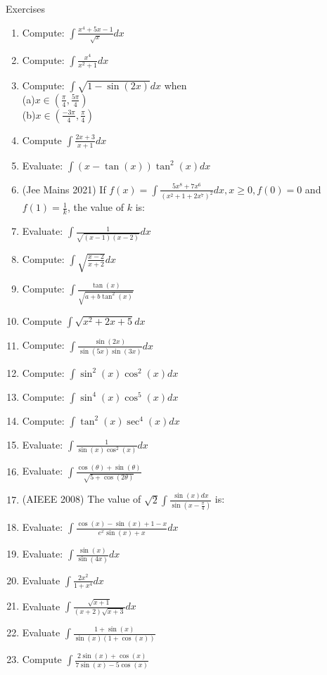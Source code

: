 \begin{xcb}{Exercises}
\begin{enumerate}
    \item Compute: $\int \frac{x^4+5x-1}{\sqrt{x}}dx$
    \item Compute: $\int \frac{x^4}{x^2+1}dx$
    \item Compute: $\int \sqrt{1-\sin(2x)}dx$ when \\ 
    (a)$x \in (\frac{\pi}{4}, \frac{5\pi}{4})$\\
    (b)$x \in (\frac{-3\pi}{4}, \frac{\pi}{4})$
    \item Compute $\int \frac{2x+3}{x+1} dx$
    \item Evaluate: $\int (x-\tan(x))\tan^2(x) dx$
    \item (Jee Mains 2021) If $f(x)=\int \frac{5x^8+7x^6}{(x^2+1+2x^7)^2}dx, x \geq 0, f(0)=0$ and $f(1)=\frac{1}{k}$, the value of $k$ is:
    \item Evaluate: $\int \frac{1}{\sqrt{(x-1)(x-2)}}dx$
    \item Compute: $\int \sqrt{\frac{x-2}{x+2}} dx$
    \item Compute: $\int \frac{\tan(x)}{\sqrt{a+b\tan^2(x)}}$
    \item Compute $\int \sqrt{x^2+2x+5} dx$
    \item Compute: $\int \frac{\sin(2x)}{\sin(5x) \sin(3x)}dx$
    \item Compute: $\int \sin^2(x)\cos^2(x) dx$
    \item Compute: $\int \sin^4(x)\cos^5(x) dx$
    \item Compute: $\int \tan^2(x)\sec^4(x) dx$
    \item Evaluate: $\int \frac{1}{\sin(x)\cos^2(x)}dx$
    \item Evaluate: $\int \frac{\cos(\theta)+\sin(\theta)}{\sqrt{5+\cos(2\theta)}}$
    \item(AIEEE 2008) The value of $\sqrt{2} \int \frac{\sin(x)dx}{\sin(x-\frac{\pi}{4})}$ is:\\
    \item Evaluate: $\int \frac{\cos(x)-\sin(x)+1-x}{e^x\sin(x)+x}dx$
    \item Evaluate: $\int \frac{\sin(x)}{\sin(4x)}dx$
    \item Evaluate $\int \frac{2x^2}{1+x^4}dx$
    \item Evaluate $\int \frac{\sqrt{x+1}}{(x+2)\sqrt{x+3}}dx$
    \item Evaluate $\int \frac{1+\sin(x)}{\sin(x)(1+\cos(x))}$
    \item Compute $\int \frac{2\sin(x)+\cos(x)}{7\sin(x)-5\cos(x)}$

\end{enumerate}
\end{xcb}
